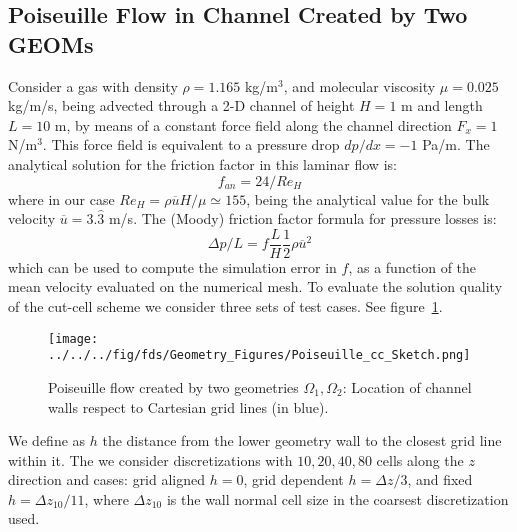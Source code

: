 \documentclass[11pt]{book}
\begin{document}
\subsection{Poiseuille Flow in Channel Created by Two GEOMs}

\label{sec:poiseuille_cc}

Consider a gas with density $\rho=1.165$ kg/m$^3$, and molecular viscosity $\mu=0.025$ kg/m/s, being advected through a 2-D channel of height $H=1$ m and length $L=10$ m, by means of a constant force field along the channel direction $F_x=1$ N/m$^3$. This force field is equivalent to a pressure drop $dp/dx=-1$ Pa/m. The analytical solution for the friction factor in this laminar flow is:
%
\begin{equation}
   f_{an} = 24/Re_H
\end{equation}
%
where in our case $Re_H= \rho \overline{u} H/ \mu \simeq 155$, being the analytical value for the bulk velocity $\overline{u}=3.\hat{3}$ m/s. The (Moody) friction factor formula for pressure losses is:
%
\begin{equation}
   \Delta p / L = f \frac{L}{H}  \frac{1}{2} \rho \overline{u}^2
\end{equation}
%
which can be used to compute the simulation error in $f$, as a function of the mean velocity evaluated on the numerical mesh. To evaluate the solution quality of the cut-cell scheme we consider three sets of test cases. See figure~\ref{Fig:PoiseSketch}.
%
\begin{figure}[h]
      \centering
      \texttt{[image: ../../../fig/fds/Geometry\_Figures/Poiseuille\_cc\_Sketch.png]}
      \caption[Poiseuille flow between two unstructured geometries]{Poiseuille flow created by two geometries $\Omega_1, \Omega_2$: Location of channel walls respect to Cartesian grid lines (in blue).}
    \label{Fig:PoiseSketch}
\end{figure}
%
We define as $h$ the distance from the lower geometry wall to the closest grid line within it. The we consider discretizations with ${10,20,40,80}$ cells along the $z$ direction and cases: grid aligned $h=0$, grid dependent $h=\Delta z /3$, and fixed $h=\Delta z_{10}/11$, where $\Delta z_{10}$ is the wall normal cell size in the coarsest discretization used.
\end{document}
